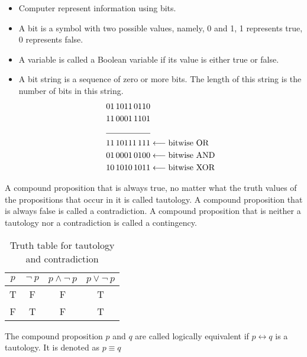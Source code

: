 \documentclass[../main-sheet.tex]{subfiles}
\begin{document}
\begin{itemize}
    \item Computer represent information using bits.
    \item A bit is a symbol with two possible values, namely, 0 and 1, 1 represents true, 0 represents false.
    \item A variable is called a Boolean variable if its value is either true or false.
    \item A bit string is a sequence of zero or more bits. The length of this string is the number of bits in this string.
          \begin{align*}
              01\,1011\,0110   &                                   \\
              11\, 0001 \,1101 &                                   \\\cline{1-1}
              11 \,10111\, 111 & \longleftarrow \text{bitwise OR}  \\
              01 \,0001 \,0100 & \longleftarrow \text{bitwise AND} \\
              10 \,1010\, 1011 & \longleftarrow \text{bitwise XOR}
          \end{align*}
\end{itemize}
\begin{defn}
    A compound proposition that is always true, no matter what the truth values of the propositions that occur in it is called tautology.
    A compound proposition that is always false is called a contradiction.
    A compound proposition that is neither a tautology nor a contradiction is called a contingency.
\end{defn}
\begin{table}[H]
    \centering
    \begin{tabular}{cccc}
        \toprule
        $ p $ & \(\neg\ p\) & \(p\wedge \neg\ p\) & \(p\vee\neg\ p\) \\ \midrule
        T     & F           & F                   & T                \\ 
        F     & T           & F                   & T                \\ \bottomrule
    \end{tabular}
    \caption{Truth table for tautology and contradiction}
\end{table}
\begin{defn}
    The compound proposition $ p $ and $ q $ are called logically equivalent if \(p\leftrightarrow q\) is a tautology. It is denoted as \(p \equiv q\)
\end{defn}
\end{document}
